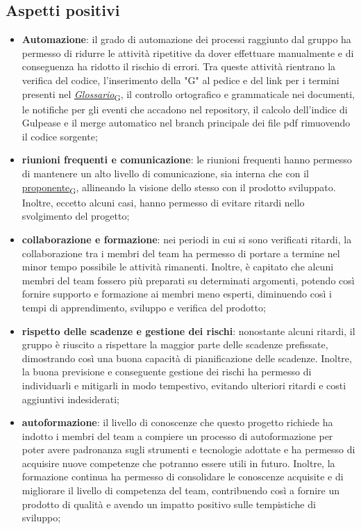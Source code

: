 \subsection{Aspetti positivi}
\begin{itemize}
    \item \textbf{Automazione}: il grado di automazione dei processi raggiunto dal gruppo ha permesso di ridurre le attività ripetitive da dover effettuare manualmente e di conseguenza ha ridotto il rischio di errori. Tra queste attività rientrano la verifica del codice, l'inserimento della "G" al pedice e del link per i termini presenti nel \href{https://7last.github.io/docs/pb/documentazione-interna/glossario\#glossario}{\textit{Glossario}\textsubscript{G}}, il controllo ortografico e grammaticale nei documenti, le notifiche per gli eventi che accadono nel repository, il calcolo dell'indice di Gulpease e il merge automatico nel branch principale dei file pdf rimuovendo il codice sorgente;
    \item \textbf{riunioni frequenti e comunicazione}: le riunioni frequenti hanno permesso di mantenere un alto livello di comunicazione, sia interna che con il \href{https://7last.github.io/docs/pb/documentazione-interna/glossario\#proponente}{proponente\textsubscript{G}}, allineando la visione dello stesso con il prodotto sviluppato. Inoltre, eccetto alcuni casi, hanno permesso di evitare ritardi nello svolgimento del progetto;
    \item \textbf{collaborazione e formazione}: nei periodi in cui si sono verificati ritardi, la collaborazione tra i membri del team ha permesso di portare a termine nel minor tempo possibile le attività rimanenti. Inoltre, è capitato che alcuni membri del team fossero più preparati su determinati argomenti, potendo così fornire supporto e formazione ai membri meno esperti, diminuendo così i tempi di apprendimento, sviluppo e verifica del prodotto;
    \item \textbf{rispetto delle scadenze e gestione dei rischi}: nonostante alcuni ritardi, il gruppo è riuscito a rispettare la maggior parte delle scadenze prefissate, dimostrando così una buona capacità di pianificazione delle scadenze. Inoltre, la buona previsione e conseguente gestione dei rischi ha permesso di individuarli e mitigarli in modo tempestivo, evitando ulteriori ritardi e costi aggiuntivi indesiderati;
    \item \textbf{autoformazione}: il livello di conoscenze che questo progetto richiede ha indotto i membri del team a compiere un processo di autoformazione per poter avere padronanza sugli strumenti e tecnologie adottate e ha permesso di acquisire nuove competenze che potranno essere utili in futuro. Inoltre, la formazione continua ha permesso di consolidare le conoscenze acquisite e di migliorare il livello di competenza del team, contribuendo così a fornire un prodotto di qualità e avendo un impatto positivo sulle tempistiche di sviluppo;

\end{itemize}
